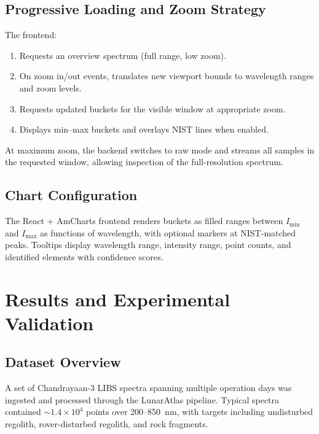 \documentclass[12pt,a4paper]{article}
\begin{document}
\subsection{Progressive Loading and Zoom Strategy}

The frontend:

\begin{enumerate}[nosep]
  \item Requests an overview spectrum (full range, low zoom).
  \item On zoom in/out events, translates new viewport bounds to wavelength ranges and zoom levels.
  \item Requests updated buckets for the visible window at appropriate zoom.
  \item Displays min--max buckets and overlays NIST lines when enabled.
\end{enumerate}

At maximum zoom, the backend switches to raw mode and streams all samples in the requested window, allowing inspection of the full-resolution spectrum.

\subsection{Chart Configuration}

The React + AmCharts frontend renders buckets as filled ranges between \(I_{\min}\) and \(I_{\max}\) as functions of wavelength, with optional markers at NIST-matched peaks. Tooltips display wavelength range, intensity range, point counts, and identified elements with confidence scores.

\section{Results and Experimental Validation}
\label{sec:results}


\subsection{Dataset Overview}

A set of Chandrayaan-3 LIBS spectra spanning multiple operation days was ingested and processed through the LunarAtlas pipeline. Typical spectra contained \(\sim 1.4\times10^{4}\) points over 200--850~nm, with targets including undisturbed regolith, rover-disturbed regolith, and rock fragments.
\end{document}
